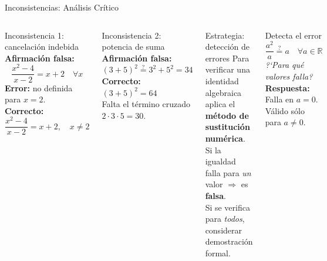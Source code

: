 \documentclass[12pt,aspectratio=169]{beamer}
\begin{document}
\begin{frame}{Inconsistencias: An\'alisis Cr\'itico}
  \begin{columns}[T]
    \begin{calert}{Inconsistencia 1: cancelaci\'on indebida}
      \small
      \textbf{Afirmaci\'on falsa:}
      \[\frac{x^{2}-4}{x-2}=x+2\quad\forall x\]
      \textbf{Error:} no definida para $x=2$.\\[4pt]
      \textbf{Correcto:}
      $\dfrac{x^{2}-4}{x-2}=x+2,\quad x\neq2$
    \end{calert}
    \vspace{5pt}
    \begin{calert}{Inconsistencia 2: potencia de suma}
      \small
      \textbf{Afirmaci\'on falsa:}
      $(3+5)^{2}\stackrel{?}{=}3^{2}+5^{2}=34$\\[4pt]
      \textbf{Correcto:} $(3+5)^{2}=64$\\
      Falta el t\'ermino cruzado $2\cdot3\cdot5=30$.
    \end{calert}

    \begin{block}{Estrategia: detecci\'on de errores}
      \small
      Para verificar una identidad algebraica aplica el
      \textbf{m\'etodo de sustituci\'on num\'erica}.\\[6pt]
      Si la igualdad falla para \emph{un} valor $\Rightarrow$
      es \textbf{falsa}.\\[6pt]
      Si se verifica para \emph{todos}, considerar demostraci\'on
      formal.
    \end{block}
    \vspace{5pt}
    \begin{cejec}{Detecta el error}
      \small
      \[\frac{a^{2}}{a}\stackrel{?}{=}a\quad\forall a\in\mathbb{R}\]
      \textit{?`Para qu\'e valores falla?}\\[4pt]
      \textbf{Respuesta:} Falla en $a=0$.\\
      V\'alido s\'olo para $a\neq0$.
    \end{cejec}
  \end{columns}
\end{frame}
\end{document}
